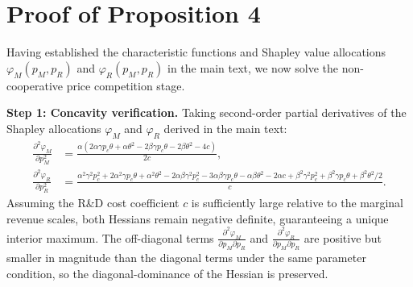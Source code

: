 \documentclass[authoryear,preprint,review,times,10pt]{elsarticle}
\begin{document}
\section{Proof of Proposition 4}

Having established the characteristic functions and Shapley value allocations $\varphi_M(p_M, p_R)$ and $\varphi_R(p_M, p_R)$ in the main text, we now solve the non-cooperative price competition stage.

\textbf{Step 1: Concavity verification.} Taking second-order partial derivatives of the Shapley allocations $\varphi_M$ and $\varphi_R$ derived in the main text:
\begin{equation}
\begin{aligned}
\frac{\partial^{2}\varphi_M}{\partial p_M^{2}} &= \frac{\alpha(2\alpha\gamma p_c \theta + \alpha\theta^{2} - 2\beta\gamma p_c \theta - 2\beta\theta^{2} - 4c)}{2c}, \\
\frac{\partial^{2}\varphi_R}{\partial p_R^{2}} &= \frac{\alpha^{2}\gamma^{2}p_{c}^{2} + 2\alpha^{2}\gamma p_{c}\theta + \alpha^{2}\theta^{2} - 2\alpha\beta\gamma^{2}p_{c}^{2} - 3\alpha\beta\gamma p_{c}\theta - \alpha\beta\theta^{2} - 2\alpha c + \beta^{2}\gamma^{2}p_{c}^{2} + \beta^{2}\gamma p_{c}\theta + \beta^{2}\theta^{2}/2}{c}.
\end{aligned}
\end{equation}
Assuming the R\&D cost coefficient $c$ is sufficiently large relative to the marginal revenue scales, both Hessians remain negative definite, guaranteeing a unique interior maximum. The off-diagonal terms $\frac{\partial^{2}\varphi_M}{\partial p_M \partial p_R}$ and $\frac{\partial^{2}\varphi_R}{\partial p_M \partial p_R}$ are positive but smaller in magnitude than the diagonal terms under the same parameter condition, so the diagonal-dominance of the Hessian is preserved.
\end{document}
